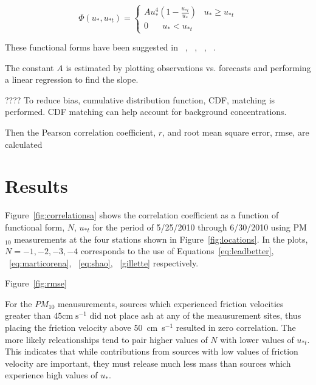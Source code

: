 \begin{equation}
\Phi(u_*, u_{*t}) =\begin{cases}
Au_*^4 (1-\frac{u_{*t}}{u_{*}})  \;\;\; u_{*} \geq u_{*t} \\
0 \;\;\;\;\;\;  u_* < u_{*t} 
\end{cases}
\label{eq:gillette}
\end{equation}

These functional forms have been suggested in ~\cite{Shao08}, ~\cite{Gillette}, ~\cite{Marticorena}, ~\cite{Leadbetter12}.

The constant $A$ is estimated by plotting observations vs. forecasts and performing a linear regression to find the slope.

????
To reduce bias, cumulative distribution function, CDF,  matching is performed. CDF matching can help account for
background concentrations.

Then the Pearson correlation coefficient, $r$,  and root mean square error, rmse, are calculated 


\section{Results}

Figure~\ref{fig:correlationsa} shows the correlation coefficient as a function of functional form, $N$, $u_{*t}$ for the period
of 5/25/2010 through 6/30/2010 using PM$_{10}$ measurements at the four stations shown in Figure~\ref{fig:locations}.
In the plots, $N=-1, -2, -3, -4$ corresponds to the use of Equations~\ref{eq:leadbetter}, ~\ref{eq:marticorena}, ~\ref{eq:shao}, ~\ref{gillette} respectively.

Figure~\ref{fig:rmse}


For the $PM_{10}$ meausurements, sources which experienced friction velocities greater than $45 \mathrm{cm} \; \mathrm{s}^{-1}$
did not place ash at any of the meausurement sites, thus placing the friction velocity above 50~cm~s$^{-1}$ resulted in zero
correlation.  
The more likely releationships tend to  pair higher values of $N$ with lower values of $u_{*t}$. This indicates that while
contributions from sources with low values of friction velocity are important, they must release much less mass than sources
which experience high values of $u_{*}$.

